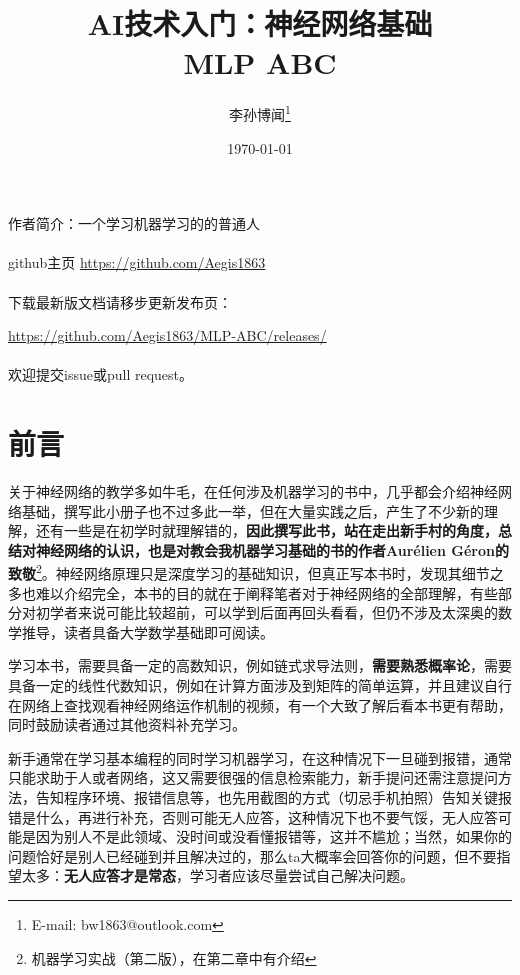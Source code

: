 \documentclass[a5paper, 11pt, openany]{book}
\title{\textbf{\huge AI技术入门：神经网络基础 \\ \Large MLP ABC}}
\author{李孙博闻\thanks{E-mail: bw1863@outlook.com}}
\date{\today}
\begin{document}
\maketitle
\newpage


作者简介：一个学习机器学习的的普通人\\ \\

github主页 \href{https://github.com/Aegis1863} {https://github.com/Aegis1863} \\ \\

下载最新版文档请移步更新发布页：

\href{https://github.com/Aegis1863/MLP-ABC/releases/}{https://github.com/Aegis1863/MLP-ABC/releases/} \\ \\

欢迎提交issue或pull request。

\chapter{前言}
关于神经网络的教学多如牛毛，在任何涉及机器学习的书中，几乎都会介绍神经网络基础，撰写此小册子也不过多此一举，但在大量实践之后，产生了不少新的理解，还有一些是在初学时就理解错的，\textbf{因此撰写此书，站在走出新手村的角度，总结对神经网络的认识，也是对教会我机器学习基础的书的作者Aurélien Géron的致敬}\footnote{机器学习实战（第二版），在第二章中有介绍}。神经网络原理只是深度学习的基础知识，但真正写本书时，发现其细节之多也难以介绍完全，本书的目的就在于阐释笔者对于神经网络的全部理解，有些部分对初学者来说可能比较超前，可以学到后面再回头看看，但仍不涉及太深奥的数学推导，读者具备大学数学基础即可阅读。

学习本书，需要具备一定的高数知识，例如链式求导法则，\textbf{需要熟悉概率论}，需要具备一定的线性代数知识，例如在计算方面涉及到矩阵的简单运算，并且建议自行在网络上查找观看神经网络运作机制的视频，有一个大致了解后看本书更有帮助，同时鼓励读者通过其他资料补充学习。

新手通常在学习基本编程的同时学习机器学习，在这种情况下一旦碰到报错，通常只能求助于人或者网络，这又需要很强的信息检索能力，新手提问还需注意提问方法，告知程序环境、报错信息等，也先用截图的方式（切忌手机拍照）告知关键报错是什么，再进行补充，否则可能无人应答，这种情况下也不要气馁，无人应答可能是因为别人不是此领域、没时间或没看懂报错等，这并不尴尬；当然，如果你的问题恰好是别人已经碰到并且解决过的，那么ta大概率会回答你的问题，但不要指望太多：\textbf{无人应答才是常态}，学习者应该尽量尝试自己解决问题。
\end{document}
